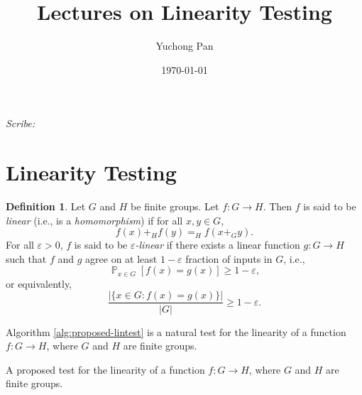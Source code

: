 \documentclass[letterpaper, reqno,11pt]{article}
\newcommand{\PP}{\mathop{{}\mathbb{P}}}
\begin{document}
\title{Lectures on Linearity Testing}
\author{Yuchong Pan}
\date{\today}
\newtheorem{theorem}{Theorem}
\newtheorem{lemma}[theorem]{Lemma}
\newtheorem{proposition}[theorem]{Proposition}
\newtheorem{corollary}[theorem]{Corollary}
\newtheorem{fact}[theorem]{Fact}
\newtheorem{problem}[theorem]{Problem}
\newtheorem{observation}[theorem]{Observation}
\newtheorem{claim}{Claim}
\newtheorem{exercise}{Exercise}
\theoremstyle{definition}
\newtheorem{definition}[theorem]{Definition}
%

\begin{framed}
 \hfill \thedate
\begin{center}
\Large{\thetitle}
\end{center}
 \hfill {\em Scribe: \theauthor}
\end{framed}

\section{Linearity Testing}

\begin{definition}
  Let $G$ and $H$ be finite groups. Let $f : G \to H$. Then $f$ is said to be \emph{linear} (i.e., is a \emph{homomorphism}) if for all $x, y \in G$,
  $$ f(x) +_H f(y) =_H f\left(x +_G y\right). $$
  For all $\varepsilon > 0$, $f$ is said to be \emph{$\varepsilon$-linear} if there exists a linear function $g : G \to H$ such that $f$ and $g$ agree on at least $1 - \varepsilon$ fraction of inputs in $G$, i.e.,
  $$ \PP_{x \in G}[f(x) = g(x)] \geq 1 - \varepsilon, $$
  or equivalently,
  $$ \frac{|\{ x \in G : f(x) = g(x) \}|}{|G|} \geq 1 - \varepsilon. $$
\end{definition}

Algorithm \ref{alg:proposed-lintest} is a natural test for the linearity of a function $f : G \to H$, where $G$ and $H$ are finite groups.

\begin{algorithm}
  \caption{A proposed test for the linearity of a function $f : G \to H$, where $G$ and $H$ are finite groups.}
  \label{alg:proposed-lintest}
\end{algorithm}
\end{document}

